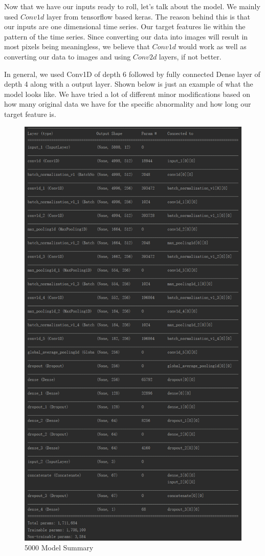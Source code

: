\documentclass[runningheads]{llncs}
\begin{document}
Now that we have our inputs ready to roll, let's talk about the model. We mainly used $Conv1d$ layer from tensorflow based keras. The reason behind this is that our inputs are one dimensional time series. Our target features lie within the pattern of the time series. Since converting our data into images will result in most pixels being meaningless, we believe that $Conv1d$ would work as well as converting our data to images and using $Conv2d$ layers, if not better. 

In general, we used Conv1D of depth 6 followed by fully connected Dense layer of depth 4 along with a output layer. Shown below is just an example of what the model looks like. We have tried a lot of different minor modifications based on how many original data we have for the specific abnormality and how long our target feature is.
\begin{figure}[H]
	\includegraphics[width=\linewidth]{img/model_summary.png}
	\caption{\label{fig:model_summary_5000} 5000 Model Summary}
\end{figure}
\end{document}
